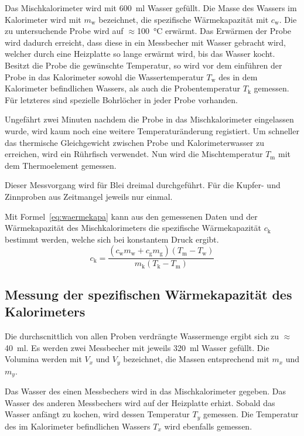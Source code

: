 Das Mischkalorimeter wird mit \SI{600}{\milli\litre} Wasser gefüllt.
Die Masse des Wassers im Kalorimeter wird mit $m_\text{w}$ bezeichnet,
 die spezifische Wärmekapazität mit $c_\text{w}$.
Die zu untersuchende Probe wird auf $\approx$\SI{100}{\celsius} erwärmt.
Das Erwärmen der Probe wird dadurch erreicht, dass diese in ein Messbecher 
mit Wasser gebracht wird, welcher durch eine Heizplatte so lange erwärmt 
wird, bis das Wasser kocht.
Besitzt die Probe die gewünschte Temperatur, so wird vor dem einführen 
der Probe in das Kalorimeter sowohl die Wassertemperatur $T_\text{w}$ des 
in dem Kalorimeter befindlichen Wassers, als auch die Probentemperatur 
$T_\text{k}$ gemessen.
Für letzteres sind spezielle Bohrlöcher in jeder Probe vorhanden.

Ungefährt zwei Minuten nachdem die Probe in das Mischkalorimeter 
eingelassen wurde, wird kaum noch eine weitere Temperaturänderung 
registiert. Um schneller das thermische Gleichgewicht zwischen Probe und 
Kalorimeterwasser zu erreichen, wird ein Rührfisch verwendet.
 Nun wird die Mischtemperatur $T_\text{m}$ mit dem 
Thermoelement gemessen.

Dieser Messvorgang wird für Blei dreimal durchgeführt.
Für die Kupfer- und Zinnproben aus Zeitmangel jeweils nur 
einmal.

Mit Formel~\eqref{eq:waermekapa} kann aus den gemessenen Daten und 
der Wärmekapazität des Mischkalorimeters die spezifische Wärmekapazität 
$c_\text{k}$ bestimmt werden, welche sich bei konstantem Druck ergibt.
%
\begin{equation}
\label{eq:waermekapa}
c_\text{k} = \frac{(c_\text{w}m_\text{w} + c_\text{g}m_\text{g})(T_\text{m} - T_\text{w})}{m_\text{k}(T_\text{k} - T_\text{m})}
\end{equation}
%
\subsection{Messung der spezifischen Wärmekapazität des Kalorimeters}
%
Die durchscnittlich von allen Proben verdrängte Wassermenge ergibt 
sich zu $\approx$\SI{40}{\milli\litre}.
Es werden zwei Messbecher mit jeweils \SI{320}{\milli\litre} Wasser 
gefüllt. Die Volumina werden mit $V_x$ und $V_y$ bezeichnet, 
die Massen entsprechend mit $m_x$ und $m_y$. 

Das Wasser des einen Messbechers wird in das Mischkalorimeter gegeben.
Das Wasser des anderen Messbechers wird auf der Heizplatte erhizt.
Sobald das Wasser anfängt zu kochen, wird dessen Temperatur $T_y$ 
gemessen. Die Temperatur des im Kalorimeter befindlichen Wassers $T_x$ 
wird ebenfalls gemessen. 

